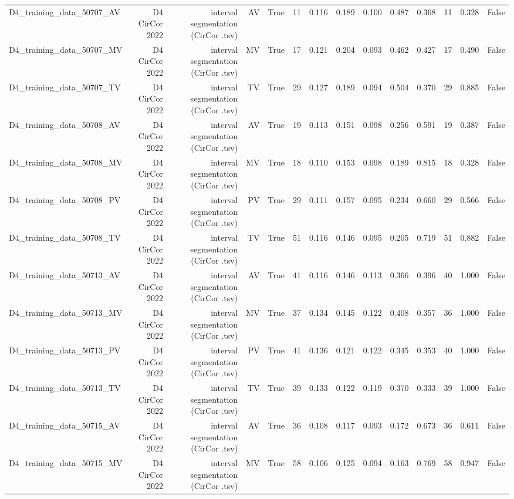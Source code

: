 \begin{table}[htbp]
\begin{tabular}{lrrrrrrrrrrrrr}
    D4\_training\_data\_50707\_AV & D4 CirCor 2022 & interval segmentation (CirCor .tsv) & AV & True & 11 & 0.116 & 0.189 & 0.100 & 0.487 & 0.368 & 11 & 0.328 & False \\
    D4\_training\_data\_50707\_MV & D4 CirCor 2022 & interval segmentation (CirCor .tsv) & MV & True & 17 & 0.121 & 0.204 & 0.093 & 0.462 & 0.427 & 17 & 0.490 & False \\
    D4\_training\_data\_50707\_TV & D4 CirCor 2022 & interval segmentation (CirCor .tsv) & TV & True & 29 & 0.127 & 0.189 & 0.094 & 0.504 & 0.370 & 29 & 0.885 & False \\
    D4\_training\_data\_50708\_AV & D4 CirCor 2022 & interval segmentation (CirCor .tsv) & AV & True & 19 & 0.113 & 0.151 & 0.098 & 0.256 & 0.591 & 19 & 0.387 & False \\
    D4\_training\_data\_50708\_MV & D4 CirCor 2022 & interval segmentation (CirCor .tsv) & MV & True & 18 & 0.110 & 0.153 & 0.098 & 0.189 & 0.815 & 18 & 0.328 & False \\
    D4\_training\_data\_50708\_PV & D4 CirCor 2022 & interval segmentation (CirCor .tsv) & PV & True & 29 & 0.111 & 0.157 & 0.095 & 0.234 & 0.660 & 29 & 0.566 & False \\
    D4\_training\_data\_50708\_TV & D4 CirCor 2022 & interval segmentation (CirCor .tsv) & TV & True & 51 & 0.116 & 0.146 & 0.095 & 0.205 & 0.719 & 51 & 0.882 & False \\
    D4\_training\_data\_50713\_AV & D4 CirCor 2022 & interval segmentation (CirCor .tsv) & AV & True & 41 & 0.116 & 0.146 & 0.113 & 0.366 & 0.396 & 40 & 1.000 & False \\
    D4\_training\_data\_50713\_MV & D4 CirCor 2022 & interval segmentation (CirCor .tsv) & MV & True & 37 & 0.134 & 0.145 & 0.122 & 0.408 & 0.357 & 36 & 1.000 & False \\
    D4\_training\_data\_50713\_PV & D4 CirCor 2022 & interval segmentation (CirCor .tsv) & PV & True & 41 & 0.136 & 0.121 & 0.122 & 0.345 & 0.353 & 40 & 1.000 & False \\
    D4\_training\_data\_50713\_TV & D4 CirCor 2022 & interval segmentation (CirCor .tsv) & TV & True & 39 & 0.133 & 0.122 & 0.119 & 0.370 & 0.333 & 39 & 1.000 & False \\
    D4\_training\_data\_50715\_AV & D4 CirCor 2022 & interval segmentation (CirCor .tsv) & AV & True & 36 & 0.108 & 0.117 & 0.093 & 0.172 & 0.673 & 36 & 0.611 & False \\
    D4\_training\_data\_50715\_MV & D4 CirCor 2022 & interval segmentation (CirCor .tsv) & MV & True & 58 & 0.106 & 0.125 & 0.094 & 0.163 & 0.769 & 58 & 0.947 & False \\

\end{tabular}
\end{table}
